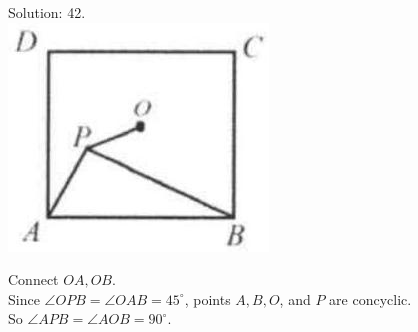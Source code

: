 \documentclass[10pt]{article}
\begin{document}
Solution: 42.\\
\includegraphics[max width=\textwidth, center]{2025_04_17_97bc1f7e44d93c271a88g-204(2)}

Connect \(O A, O B\).\\
Since \(\angle O P B=\angle O A B=45^{\circ}\), points \(A, B, O\), and \(P\) are concyclic.\\
So \(\angle A P B=\angle A O B=90^{\circ}\).
\end{document}
